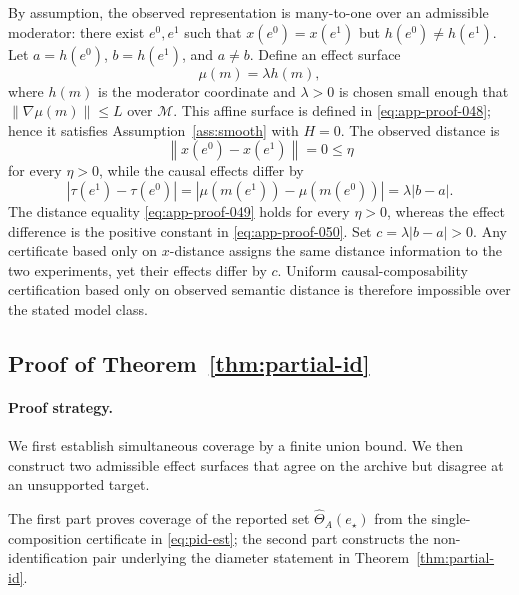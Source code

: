 \documentclass[11pt]{article}
\numberwithin{equation}{section}
\newcommand{\1}{\mathbf 1}
\newcommand{\cM}{\mathcal M}
\newcommand{\norm}[1]{\left\lVert #1\right\rVert}
\newcommand{\abs}[1]{\left\lvert #1\right\rvert}
\begin{document}
By assumption, the observed representation is many-to-one over an admissible moderator: there exist \(e^0,e^1\) such that \(x(e^0)=x(e^1)\) but \(h(e^0)\ne h(e^1)\).  Let \(a=h(e^0)\), \(b=h(e^1)\), and \(a\ne b\).  Define an effect surface
\begin{equation}
\label{eq:app-proof-048}
\mu(m)=\lambda h(m),
\end{equation}
where \(h(m)\) is the moderator coordinate and \(\lambda>0\) is chosen small enough that \(\norm{\nabla\mu(m)}\le L\) over \(\cM\).  This affine surface is defined in \eqref{eq:app-proof-048}; hence it satisfies Assumption~\ref{ass:smooth} with \(H=0\).  The observed distance is
\begin{equation}
\label{eq:app-proof-049}
\norm{x(e^0)-x(e^1)}=0\le\eta
\end{equation}
for every \(\eta>0\), while the causal effects differ by
\begin{equation}
\label{eq:app-proof-050}
\abs{\tau(e^1)-\tau(e^0)}
  =\abs{\mu(m(e^1))-\mu(m(e^0))}
  =\lambda\abs{b-a}.
\end{equation}
The distance equality \eqref{eq:app-proof-049} holds for every \(\eta>0\),
whereas the effect difference is the positive constant in
\eqref{eq:app-proof-050}.  Set \(c=\lambda\abs{b-a}>0\).  Any certificate
based only on \(x\)-distance assigns the same distance information to the two
experiments, yet their effects differ by \(c\).  Uniform
causal-composability certification based only on observed semantic distance
is therefore impossible over the stated model class.

\subsection{Proof of Theorem~\ref{thm:partial-id}}
\label{app:proof-thm-partial-id}

\paragraph{Proof strategy.} We first establish simultaneous coverage by a finite union bound.  We then construct two admissible effect surfaces that agree on the archive but disagree at an unsupported target.

The first part proves coverage of the reported set \(\widehat\Theta_A(e_\star)\)
from the single-composition certificate in \eqref{eq:pid-est}; the second
part constructs the non-identification pair underlying the diameter statement
in Theorem~\ref{thm:partial-id}.
\end{document}
